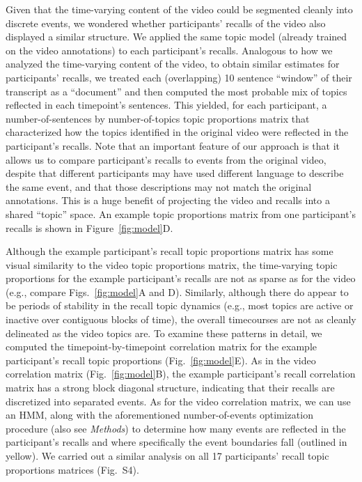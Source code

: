 \documentclass{article}
\newcommand{\corrmats}{S4}
\begin{document}
Given that the time-varying content of the video could be segmented cleanly into discrete events, we wondered whether participants' recalls of the video also displayed a similar structure.  We applied the same topic model (already trained on the video annotations) to each participant's recalls.  Analogous to how we analyzed the time-varying content of the video, to obtain similar estimates for participants' recalls, we treated each (overlapping) 10 sentence ``window'' of their transcript as a ``document'' and then computed the most probable mix of topics reflected in each timepoint's sentences.  This yielded, for each participant, a number-of-sentences by number-of-topics topic proportions matrix that characterized how the topics identified in the original video were reflected in the participant's recalls.  Note that an important feature of our approach is that it allows us to compare participant's recalls to events from the original video, despite that different participants may have used different language to describe the same event, and that those descriptions may not match the original annotations.  This is a huge benefit of projecting the video and recalls into a shared ``topic'' space.  An example topic proportions matrix from one participant's recalls is shown in Figure~\ref{fig:model}D.

Although the example participant's recall topic proportions matrix has some visual similarity to the video topic proportions matrix, the time-varying topic proportions for the example participant's recalls are not as sparse as for the video (e.g., compare Figs.~\ref{fig:model}A and D).  Similarly, although there do appear to be periods of stability in the recall topic dynamics (e.g., most topics are active or inactive over contiguous blocks of time), the overall timecourses are not as cleanly delineated as the video topics are.  To examine these patterns in detail, we computed the timepoint-by-timepoint correlation matrix for the example participant's recall topic proportions (Fig.~\ref{fig:model}E).  As in the video correlation matrix (Fig.~\ref{fig:model}B), the example participant's recall correlation matrix has a strong block diagonal structure, indicating that their recalls are discretized into separated events.  As for the video correlation matrix, we can use an HMM, along with the aforementioned number-of-events optimization procedure (also see \textit{Methods}) to determine how many events are reflected in the participant's recalls and where specifically the event boundaries fall (outlined in yellow).  We carried out a similar analysis on all 17 participants' recall topic proportions matrices (Fig.~\corrmats).
\end{document}
